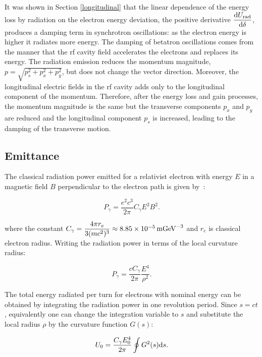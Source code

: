 It was shown in Section \ref{longitudinal} that the linear dependence of the energy loss by radiation on the electron energy deviation, the positive derivative $\dfrac{\mathrm{d} U_{\mathrm{rad}}}{\mathrm{d} \delta}$, produces a damping term in synchrotron oscillations: as the electron energy is higher it radiates more energy. The damping of betatron oscillations comes from the manner that the \gls{rf} cavity field accelerates the electrons and replaces its energy. The radiation emission reduces the momentum magnitude, $p = \sqrt{p_s
^2+ p_x^2 +p_y^2}$, but does not change the vector direction. Moreover, the longitudinal electric fields in the \gls{rf} cavity adds only to the longitudinal component of the momentum. Therefore, after the energy loss and gain processes, the momentum magnitude is the same but the transverse components $p_x$ and $p_y$ are reduced and the longitudinal component $p_s$ is increased, leading to the damping of the transverse motion.

\subsection{Emittance}

The classical radiation power emitted for a relativist electron with energy $E$ in a magnetic field $B$ perpendicular to the electron path is given by~\cite{jackson}:

\begin{equation}
    P_{\gamma} = \dfrac{e^2c^3}{2\pi} C_{\gamma} E^2 B^2.
\end{equation}

where the constant $C_{\gamma} = \dfrac{4 \pi r_e}{3 (mc^2)^3} \approx \SI{8.85e-5}{\metre {\giga \electronvolt}^{-3}}$ and $r_e$ is classical electron radius. Writing the radiation power in terms of the local curvature radius:

\begin{equation}
    P_{\gamma} = \dfrac{cC_{\gamma}}{2\pi} \dfrac{E^4}{\rho^2}.
\end{equation}

The total energy radiated per turn for electrons with nominal energy can be obtained by integrating the radiation power in one revolution period. Since $s = ct$, equivalently one can change the integration variable to $s$ and substitute the local radius $\rho$ by the curvature function $G(s)$:

\begin{equation}
U_0 = \dfrac{C_{\gamma}E_0^4}{2\pi} \oint G^{2}(s) \mathrm{d} s.    
\end{equation}

